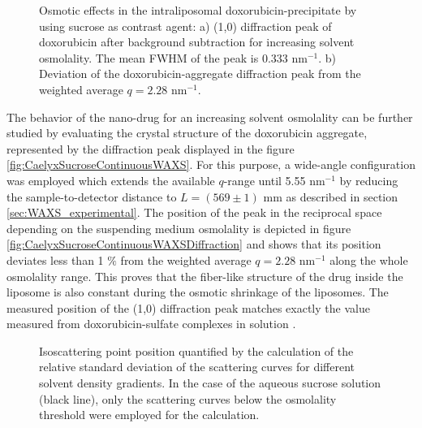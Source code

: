 \begin{figure}
	\centering
		\caption[Osmotic effects in the intraliposomal doxorubicin-precipitate]{Osmotic effects in the intraliposomal doxorubicin-precipitate by using sucrose as contrast agent: a) (1,0) diffraction peak of doxorubicin after background subtraction for increasing solvent osmolality. The mean FWHM of the peak is 0.333  nm$^{-1}$. b) Deviation of the doxorubicin-aggregate diffraction peak from the weighted average $q=2.28$ nm$^{-1}$.}
\end{figure}

The behavior of the nano-drug for an increasing solvent osmolality can be further studied by evaluating the crystal structure of the doxorubicin aggregate, represented by the diffraction peak displayed in the figure \ref{fig:CaelyxSucroseContinuousWAXS}. For this purpose, a wide-angle configuration was employed which extends the available $q$-range until 5.55 nm$^{-1}$ by reducing the sample-to-detector distance to $L = (569 \pm  1)$ mm as described in section \ref{sec:WAXS_experimental}. The position of the peak in the reciprocal space depending on the suspending medium osmolality is depicted in figure \ref{fig:CaelyxSucroseContinuousWAXSDiffraction} and shows that its position deviates less than 1 $\%$ from the weighted average $q=2.28$ nm$^{-1}$ along the whole osmolality range. This proves that the fiber-like structure of the drug inside the liposome is also constant during the osmotic shrinkage of the liposomes. The measured position of the (1,0) diffraction peak matches exactly the value measured from doxorubicin-sulfate complexes in solution \citep{lasic_gelation_1992}. 

\begin{figure}
	\centering
		
		\caption[Isoscattering point position of Caelyx with different solvents.]{Isoscattering point position quantified by the calculation of the relative standard deviation of the scattering curves for different solvent density gradients. In the case of the aqueous sucrose solution (black line), only the scattering curves below the osmolality threshold were employed for the calculation.}
		\label{fig:CaelyxIsopointComparison}
\end{figure}

